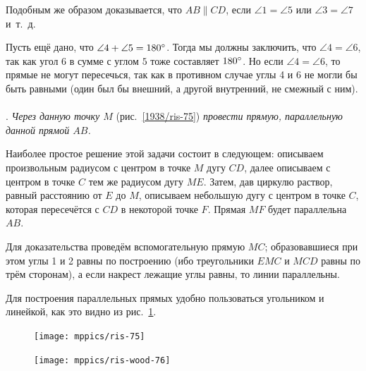 Подобным же образом доказывается, что $AB \parallel CD$, если $\angle 1 = \angle 5$ или $\angle 3 = \angle 7$ и~т.~д.

Пусть ещё дано, что $\angle 4 + \angle 5 = 180\degree$.
Тогда мы должны заключить, что $\angle 4 = \angle 6$, так как угол $6$ в сумме с углом $5$ тоже составляет $180\degree$.
Но если $\angle 4 = \angle 6$, то прямые не могут пересечься, так как в противном случае углы 4 и 6 не могли бы быть равными (один был бы внешний, а другой внутренний, не смежный с ним).

\paragraph{}\label{1938/74}
.
\emph{Через данную точку $M$} (рис.~\ref{1938/ris-75}) \emph{провести прямую, параллельную данной прямой $AB$.}

Наиболее простое решение этой задачи состоит в следующем:
описываем произвольным радиусом с центром в точке $M$ дугу $CD$, далее описываем с центром в точке $C$ тем же радиусом дугу $ME$.
Затем, дав циркулю раствор, равный расстоянию от $E$ до $M$, описываем небольшую дугу с центром в точке $C$, которая пересечётся с $CD$ в некоторой точке $F$.
Прямая $MF$ будет параллельна $AB$.

Для доказательства проведём вспомогательную прямую $MC$;
образовавшиеся при этом углы 1 и 2 равны по построению (ибо треугольники $EMC$ и $MCD$ равны по трём сторонам), а если накрест лежащие углы равны, то линии параллельны.

Для построения параллельных прямых удобно пользоваться угольником и линейкой, как это видно из рис.~\ref{1938/ris-76}.

\begin{figure}[h!]
\begin{minipage}{.28\textwidth}
\centering
\texttt{[image: mppics/ris-75]}
\end{minipage}\hfill
\begin{minipage}{.58\textwidth}
\centering
\texttt{[image: mppics/ris-wood-76]}
\end{minipage}

\medskip

\begin{minipage}{.32\textwidth}
\centering
{}\label{1938/ris-75}
\end{minipage}\hfill
\begin{minipage}{.54\textwidth}
\centering
\caption{}\label{1938/ris-76}
\end{minipage}
\vskip-4mm
\end{figure}

